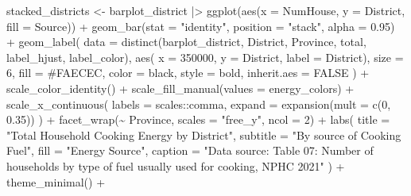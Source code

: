\documentclass[
  letterpaper,
  DIV=11,
  numbers=noendperiod]{scrartcl}
\newenvironment{Shaded}{\begin{snugshade}}{\end{snugshade}}
\newcommand{\AttributeTok}[1]{\textcolor[rgb]{0.40,0.45,0.13}{#1}}
\newcommand{\ConstantTok}[1]{\textcolor[rgb]{0.56,0.35,0.01}{#1}}
\newcommand{\DecValTok}[1]{\textcolor[rgb]{0.68,0.00,0.00}{#1}}
\newcommand{\FloatTok}[1]{\textcolor[rgb]{0.68,0.00,0.00}{#1}}
\newcommand{\FunctionTok}[1]{\textcolor[rgb]{0.28,0.35,0.67}{#1}}
\newcommand{\NormalTok}[1]{\textcolor[rgb]{0.00,0.23,0.31}{#1}}
\newcommand{\OtherTok}[1]{\textcolor[rgb]{0.00,0.23,0.31}{#1}}
\newcommand{\SpecialCharTok}[1]{\textcolor[rgb]{0.37,0.37,0.37}{#1}}
\newcommand{\StringTok}[1]{\textcolor[rgb]{0.13,0.47,0.30}{#1}}
\begin{document}
\begin{Shaded}
\begin{Highlighting}[]
\NormalTok{stacked\_districts }\OtherTok{\textless{}{-}}\NormalTok{ barplot\_district }\SpecialCharTok{|\textgreater{}}
  \FunctionTok{ggplot}\NormalTok{(}\FunctionTok{aes}\NormalTok{(}\AttributeTok{x =}\NormalTok{ NumHouse, }\AttributeTok{y =}\NormalTok{ District, }\AttributeTok{fill =}\NormalTok{ Source)) }\SpecialCharTok{+}
  \FunctionTok{geom\_bar}\NormalTok{(}\AttributeTok{stat =} \StringTok{"identity"}\NormalTok{, }\AttributeTok{position =} \StringTok{"stack"}\NormalTok{, }\AttributeTok{alpha =} \FloatTok{0.95}\NormalTok{) }\SpecialCharTok{+}
  \FunctionTok{geom\_label}\NormalTok{(}
    \AttributeTok{data =} \FunctionTok{distinct}\NormalTok{(barplot\_district, District, Province, total,  }
\NormalTok{                    label\_hjust, label\_color),}
\FunctionTok{aes}\NormalTok{(}
  \AttributeTok{x =} \DecValTok{350000}\NormalTok{,}
  \AttributeTok{y =}\NormalTok{ District,}
  \AttributeTok{label =}\NormalTok{ District),}
\AttributeTok{size =} \DecValTok{6}\NormalTok{,}
\AttributeTok{fill =} \StringTok{\textquotesingle{}\#FAECEC\textquotesingle{}}\NormalTok{,}
\AttributeTok{color =} \StringTok{\textquotesingle{}black\textquotesingle{}}\NormalTok{,}
\AttributeTok{style =} \StringTok{\textquotesingle{}bold\textquotesingle{}}\NormalTok{,}
\AttributeTok{inherit.aes =} \ConstantTok{FALSE}
\NormalTok{  ) }\SpecialCharTok{+}
  \FunctionTok{scale\_color\_identity}\NormalTok{() }\SpecialCharTok{+}
  \FunctionTok{scale\_fill\_manual}\NormalTok{(}\AttributeTok{values =}\NormalTok{ energy\_colors) }\SpecialCharTok{+}
  \FunctionTok{scale\_x\_continuous}\NormalTok{(}
    \AttributeTok{labels =}\NormalTok{ scales}\SpecialCharTok{::}\NormalTok{comma,}
    \AttributeTok{expand =} \FunctionTok{expansion}\NormalTok{(}\AttributeTok{mult =} \FunctionTok{c}\NormalTok{(}\DecValTok{0}\NormalTok{, }\FloatTok{0.35}\NormalTok{))}
\NormalTok{  ) }\SpecialCharTok{+}
  \FunctionTok{facet\_wrap}\NormalTok{(}\SpecialCharTok{\textasciitilde{}}\NormalTok{ Province, }\AttributeTok{scales =} \StringTok{"free\_y"}\NormalTok{, }\AttributeTok{ncol =} \DecValTok{2}\NormalTok{) }\SpecialCharTok{+}
  \FunctionTok{labs}\NormalTok{(}
    \AttributeTok{title  =} \StringTok{"Total Household Cooking Energy by District"}\NormalTok{,}
    \AttributeTok{subtitle =} \StringTok{"By source of Cooking Fuel"}\NormalTok{,}
    \AttributeTok{fill  =} \StringTok{"Energy Source"}\NormalTok{,}
    \AttributeTok{caption =} \StringTok{"Data source: Table 07: Number of households by type of fuel usually used for cooking, NPHC 2021"}
\NormalTok{  ) }\SpecialCharTok{+}
  \FunctionTok{theme\_minimal}\NormalTok{() }\SpecialCharTok{+}

\end{Highlighting}
\end{Shaded}
\end{document}
